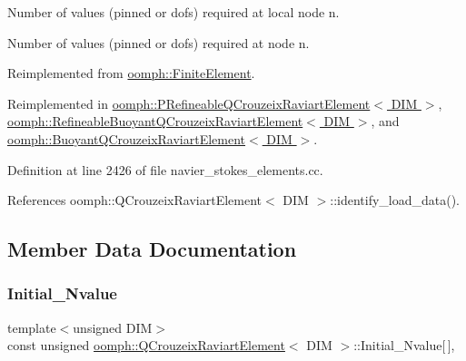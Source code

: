 Number of values (pinned or dofs) required at local node n. 

Number of values (pinned or dofs) required at node n. 

Reimplemented from \hyperlink{classoomph_1_1FiniteElement_a56610c60d5bc2d7c27407a1455471b1a}{oomph\+::\+Finite\+Element}.



Reimplemented in \hyperlink{classoomph_1_1PRefineableQCrouzeixRaviartElement_a5789a5ace7a5d633dec82c775ac890bf}{oomph\+::\+P\+Refineable\+Q\+Crouzeix\+Raviart\+Element$<$ D\+I\+M $>$}, \hyperlink{classoomph_1_1RefineableBuoyantQCrouzeixRaviartElement_a664008af1b7a6444cee34bd4f506c318}{oomph\+::\+Refineable\+Buoyant\+Q\+Crouzeix\+Raviart\+Element$<$ D\+I\+M $>$}, and \hyperlink{classoomph_1_1BuoyantQCrouzeixRaviartElement_a64b84c9cf74a06680136d465ff9e037b}{oomph\+::\+Buoyant\+Q\+Crouzeix\+Raviart\+Element$<$ D\+I\+M $>$}.



Definition at line 2426 of file navier\+\_\+stokes\+\_\+elements.\+cc.



References oomph\+::\+Q\+Crouzeix\+Raviart\+Element$<$ D\+I\+M $>$\+::identify\+\_\+load\+\_\+data().



\subsection{Member Data Documentation}
\mbox{\label{classoomph_1_1QCrouzeixRaviartElement_a7facb695d20c987c1c4d47ac16cf24b6}} 
\subsubsection{\texorpdfstring{Initial\+\_\+\+Nvalue}{Initial\_Nvalue}}
{\footnotesize\ttfamily template$<$unsigned D\+IM$>$ \\
const unsigned \hyperlink{classoomph_1_1QCrouzeixRaviartElement}{oomph\+::\+Q\+Crouzeix\+Raviart\+Element}$<$ D\+IM $>$\+::Initial\+\_\+\+Nvalue\mbox{[}$\,$\mbox{]}\hspace{0.3cm}{\ttfamily [static]}, {\ttfamily [private]}}



